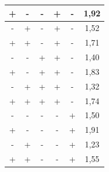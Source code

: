 \begin{table}[H]
\begin{tabular}{|c|c|c|c|c|c|}
  \rowcolor[HTML]{EFEFEF} 
  +                         & -                         & -                         & +                         & -                    & 1,92                         \\ \hline
  \rowcolor[HTML]{FFFFFF} 
  -                         & +                         & -                         & +                         & -                    & 1,52                         \\ \hline
  \rowcolor[HTML]{EFEFEF} 
  +                         & +                         & -                         & +                         & -                    & 1,71                         \\ \hline
  \rowcolor[HTML]{FFFFFF} 
  -                         & -                         & +                         & +                         & -                    & 1,40                         \\ \hline
  \rowcolor[HTML]{EFEFEF} 
  +                         & -                         & +                         & +                         & -                    & 1,83                         \\ \hline
  \rowcolor[HTML]{FFFFFF} 
  -                         & +                         & +                         & +                         & -                    & 1,32                         \\ \hline
  \rowcolor[HTML]{EFEFEF} 
  +                         & +                         & +                         & +                         & -                    & 1,74                         \\ \hline
  \rowcolor[HTML]{FFFFFF} 
  -                         & -                         & -                         & -                         & +                    & 1,50                         \\ \hline
  \rowcolor[HTML]{EFEFEF} 
  +                         & -                         & -                         & -                         & +                    & 1,91                         \\ \hline
  \rowcolor[HTML]{FFFFFF} 
  -                         & +                         & -                         & -                         & +                    & 1,23                         \\ \hline
  \rowcolor[HTML]{EFEFEF} 
  +                         & +                         & -                         & -                         & +                    & 1,55                         \\ \hline

\end{tabular}
\end{table}
